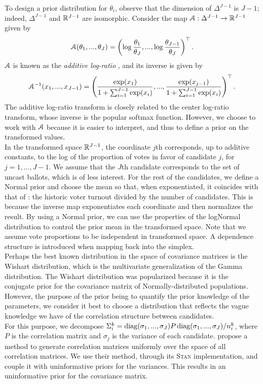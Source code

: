 \documentclass{article}
\begin{document}
To design a prior distribution for $\theta_i$, observe that the dimension of $\Delta^{J-1}$ is $J-1$; indeed, $\Delta^{J-1}$ and $\mathbb{R}^{J-1}$ are isomorphic. Consider the map $\mathcal{A}: \Delta^{J-1} \to \mathbb{R}^{J-1}$ given by
\[
  \mathcal{A} (\theta_1, ..., \theta_J) = \left( \log \frac{\theta_1}{\theta_J}, ..., \log \frac{\theta_{J-1}}{\theta_J} \right)^\top.
\]
$\mathcal{A}$ is known as the \textit{additive log-ratio} \citep{aitchison1982}, and its inverse is given by
\[
  \mathcal{A}^{-1} (x_1, ..., x_{J-1}) = \left( \frac{\exp(x_1)}{1 + \sum_{i=1}^{J-1} \exp(x_i)}, ..., \frac{\exp(x_{j-1})}{1 + \sum_{i=1}^{J-1} \exp(x_i)} \right)^\top.
\]
The additive log-ratio transform is closely related to the center log-ratio transform, whose inverse is the popular softmax function. However, we choose to work with $\mathcal{A}$ because it is easier to interpret, and thus to define a prior on the transformed values. \\

In the transformed space $\mathbb{R}^{J-1}$, the coordinate $j$th corresponds, up to additive constants, to the log of the proportion of votes in favor of candidate $j$, for $j=1, ..., J-1$. We assume that the $J$th candidate corresponds to the set of uncast ballots, which is of less interest. For the rest of the candidates, we define a Normal prior and choose the mean so that, when exponentiated, it coincides with that of \citet{diluvi2018}: the historic voter turnout divided by the number of candidates. This is because the inverse map exponentiates each coordinate and then normalizes the result. By using a Normal prior, we can use the properties of the logNormal distribution to control the prior mean in the transformed space. Note that we assume vote proportions to be independent in transformed space. A dependence structure is introduced when mapping back into the simplex.
\\


Perhaps the best known distribution in the space of covariance matrices is the Wishart distribution, which is the multivariate generalization of the Gamma distribution. The Wishart distribution was popularized because it is the conjugate prior for the covariance matrix of Normally-distributed populations. However, the purpose of the prior being to quantify the prior knowledge of the parameters, we consider it best to choose a distribution that reflects the vague knowledge we have of the correlation structure between candidates.
\\

For this purpose, we decompose $\Sigma_i^k = \operatorname{diag}(\sigma_1, ..., \sigma_J) P \operatorname{diag}(\sigma_1, ..., \sigma_J) / n_i^k$, where $P$ is the correlation matrix and $\sigma_j$ is the variance of each candidate. \citet{lewandowski2009} propose a method to generate correlation matrices uniformly over the space of all correlation matrices. We use their method, through its \textsc{Stan} implementation, and couple it with uninformative priors for the variances. This results in an uninformative prior for the covariance matrix.
\\
\end{document}
